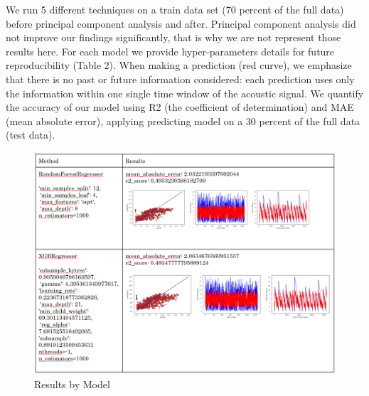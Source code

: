 \documentclass[]{llncs}
\begin{document}
We run 5 different techniques on a train data set (70 percent of the full data) before principal component analysis and after. Principal component analysis did not improve our findings significantly, that is why we are not represent those results here. For each model we provide hyper-parameters details for future reproducibility (Table 2).
When making a prediction (red curve), we emphasize that there is no past or future information considered: each prediction uses only the information within one single time window of the acoustic signal. We quantify the accuracy of our model using R2 (the coefficient of determination) and MAE (mean absolute error), applying predicting model on a 30 percent of the full data (test data).



\begin{figure}
	\centering
	\includegraphics[width=1\linewidth]{../GPUProject/Results1.PNG}
	\caption{Results by Model}
	\label{fig:morethan90percentd}
\end{figure}
\end{document}
